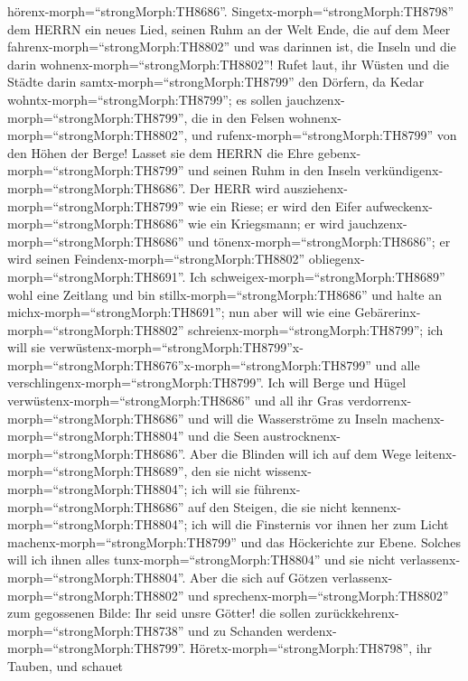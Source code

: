 hörenx-morph=``strongMorph:TH8686''. 
Singetx-morph=``strongMorph:TH8798'' dem HERRN ein neues Lied, seinen
Ruhm an der Welt Ende, die auf dem Meer
fahrenx-morph=``strongMorph:TH8802'' und was darinnen ist, die Inseln
und die darin wohnenx-morph=``strongMorph:TH8802''!  Rufet
laut, ihr Wüsten und die Städte darin samtx-morph=``strongMorph:TH8799''
den Dörfern, da Kedar wohntx-morph=``strongMorph:TH8799''; es sollen
jauchzenx-morph=``strongMorph:TH8799'', die in den Felsen
wohnenx-morph=``strongMorph:TH8802'', und
rufenx-morph=``strongMorph:TH8799'' von den Höhen der Berge!
 Lasset sie dem HERRN die Ehre
gebenx-morph=``strongMorph:TH8799'' und seinen Ruhm in den Inseln
verkündigenx-morph=``strongMorph:TH8686''.  Der HERR wird
ausziehenx-morph=``strongMorph:TH8799'' wie ein Riese; er wird den Eifer
aufweckenx-morph=``strongMorph:TH8686'' wie ein Kriegsmann; er wird
jauchzenx-morph=``strongMorph:TH8686'' und
tönenx-morph=``strongMorph:TH8686''; er wird seinen
Feindenx-morph=``strongMorph:TH8802''
obliegenx-morph=``strongMorph:TH8691''.  Ich
schweigex-morph=``strongMorph:TH8689'' wohl eine Zeitlang und bin
stillx-morph=``strongMorph:TH8686'' und halte an
michx-morph=``strongMorph:TH8691''; nun aber will wie eine
Gebärerinx-morph=``strongMorph:TH8802''
schreienx-morph=``strongMorph:TH8799''; ich will sie
verwüstenx-morph=``strongMorph:TH8799''\textbar x-morph=``strongMorph:TH8676''x-morph=``strongMorph:TH8799''
und alle verschlingenx-morph=``strongMorph:TH8799''.  Ich
will Berge und Hügel verwüstenx-morph=``strongMorph:TH8686'' und all ihr
Gras verdorrenx-morph=``strongMorph:TH8686'' und will die Wasserströme
zu Inseln machenx-morph=``strongMorph:TH8804'' und die Seen
austrocknenx-morph=``strongMorph:TH8686''.  Aber die
Blinden will ich auf dem Wege leitenx-morph=``strongMorph:TH8689'', den
sie nicht wissenx-morph=``strongMorph:TH8804''; ich will sie
führenx-morph=``strongMorph:TH8686'' auf den Steigen, die sie nicht
kennenx-morph=``strongMorph:TH8804''; ich will die Finsternis vor ihnen
her zum Licht machenx-morph=``strongMorph:TH8799'' und das Höckerichte
zur Ebene. Solches will ich ihnen alles
tunx-morph=``strongMorph:TH8804'' und sie nicht
verlassenx-morph=``strongMorph:TH8804''.  Aber die sich auf
Götzen verlassenx-morph=``strongMorph:TH8802'' und
sprechenx-morph=``strongMorph:TH8802'' zum gegossenen Bilde: Ihr seid
unsre Götter! die sollen zurückkehrenx-morph=``strongMorph:TH8738'' und
zu Schanden werdenx-morph=``strongMorph:TH8799''. 
Höretx-morph=``strongMorph:TH8798'', ihr Tauben, und schauet
